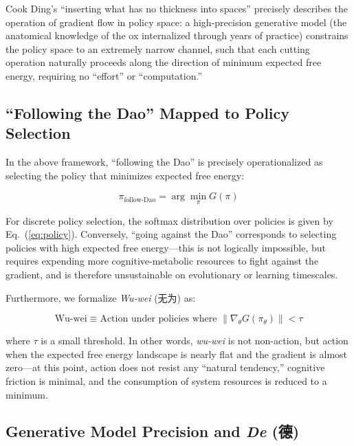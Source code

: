 \documentclass[11pt,a4paper]{article}
\begin{document}
Cook Ding's ``inserting what has no thickness into spaces'' precisely describes the operation of gradient flow in policy space: a high-precision generative model (the anatomical knowledge of the ox internalized through years of practice) constrains the policy space to an extremely narrow channel, such that each cutting operation naturally proceeds along the direction of minimum expected free energy, requiring no ``effort'' or ``computation.''

\subsection{``Following the Dao'' Mapped to Policy Selection}

In the above framework, ``following the Dao'' is precisely operationalized as selecting the policy that minimizes expected free energy:

\begin{equation}
\pi_{\text{follow-Dao}} = \arg\min_\pi G(\pi)
\label{eq:follow_dao}
\end{equation}

For discrete policy selection, the softmax distribution over policies is given by Eq.~(\ref{eq:policy}). Conversely, ``going against the Dao'' corresponds to selecting policies with high expected free energy---this is not logically impossible, but requires expending more cognitive-metabolic resources to fight against the gradient, and is therefore unsustainable on evolutionary or learning timescales.

Furthermore, we formalize \textit{Wu-wei} (无为) as:

\begin{equation}
\text{Wu-wei} \equiv \text{Action under policies where } \|\nabla_\theta G(\pi_\theta)\| < \tau
\label{eq:wuwei}
\end{equation}

where $\tau$ is a small threshold. In other words, \textit{wu-wei} is not non-action, but action when the expected free energy landscape is nearly flat and the gradient is almost zero---at this point, action does not resist any ``natural tendency,'' cognitive friction is minimal, and the consumption of system resources is reduced to a minimum.

\subsection{Generative Model Precision and \textit{De} (德)}
\end{document}

